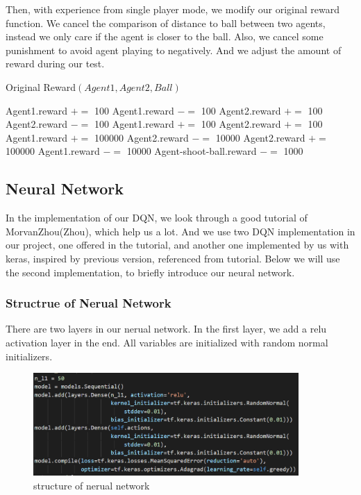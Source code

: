 \documentclass[12pt]{article}
\begin{document}
Then, with experience from single player mode, we modify our original reward function. We cancel the comparison of distance to ball between two agents, instead we only care if the agent is closer to the ball. Also, we cancel some punishment to avoid agent playing to negatively. And we adjust the amount of reward during our test.
\begin{algorithm}[H]
	\caption{Original Reward$(Agent1,Agent2,Ball)$}
	\begin{algorithmic}
		\State Agent1.reward $+=$ 100
		\Else
		\State Agent1.reward $-=$ 100
		\EndIf
		\State Agent2.reward $+=$ 100
		\Else
		\State Agent2.reward $-=$ 100
		\EndIf
		\State Agent1.reward $+=$ 100
		\EndIf
		\State Agent2.reward $+=$ 100
		\EndIf
		\State Agent1.reward $+=$ 100000
		\State Agent2.reward $-=$ 10000
		\EndIf
		\State Agent2.reward $+=$ 100000
		\State Agent1.reward $-=$ 10000
		\EndIf
		\State Agent-shoot-ball.reward $-=$ 1000
		\EndIf
	\end{algorithmic}
\end{algorithm}

\subsection{Neural Network}
In the implementation of our DQN, we look through a good tutorial of MorvanZhou(Zhou), which help us a lot. And we use two DQN implementation in our project, one offered in the tutorial, and another one implemented by us with keras, inspired by previous version, referenced from tutorial. Below we will use the second implementation, to briefly introduce our neural network.

\subsubsection{Structrue of Nerual Network}
There are two layers in our nerual network. In the first layer, we add a relu activation layer in the end. All variables are initialized with random normal initializers.
\begin{figure}[H]
	\begin{center}
		\includegraphics[width=0.9\textwidth]{network}
		\caption{structure of nerual network}
	\end{center}
\end{figure}
\end{document}
